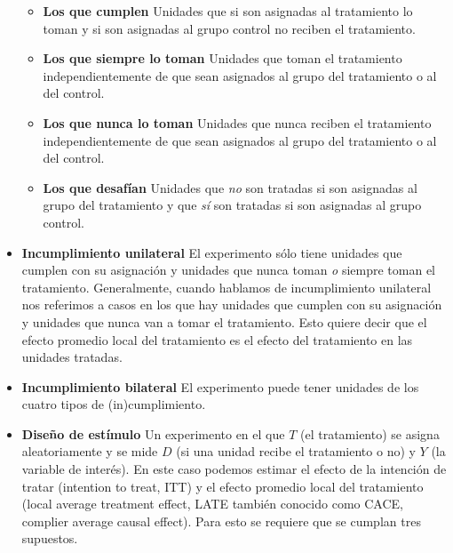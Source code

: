 \documentclass[
  12pt,
  spanish,
]{book}
\providecommand{\tightlist}{%
  \setlength{\itemsep}{0pt}\setlength{\parskip}{0pt}}
\begin{document}
\begin{itemize}
  \begin{itemize}
  \tightlist
  \item
    \textbf{Los que cumplen} Unidades que si son asignadas al tratamiento lo toman y si son asignadas al grupo control no reciben el tratamiento.
  \item
    \textbf{Los que siempre lo toman} Unidades que toman el tratamiento independientemente de que sean asignados al grupo del tratamiento o al del control.
  \item
    \textbf{Los que nunca lo toman} Unidades que nunca reciben el tratamiento independientemente de que sean asignados al grupo del tratamiento o al del control.
  \item
    \textbf{Los que desafían} Unidades que \emph{no} son tratadas si son asignadas al grupo del tratamiento y que \emph{sí} son tratadas si son asignadas al grupo control.
  \end{itemize}
\item
  \textbf{Incumplimiento unilateral} El experimento sólo tiene unidades que cumplen con su asignación y unidades que nunca toman \emph{o} siempre toman el tratamiento. Generalmente, cuando hablamos de incumplimiento unilateral nos referimos a casos en los que hay unidades que cumplen con su asignación y unidades que nunca van a tomar el tratamiento. Esto quiere decir que el efecto promedio local del tratamiento es el efecto del tratamiento en las unidades tratadas.
\item
  \textbf{Incumplimiento bilateral} El experimento puede tener unidades de los cuatro tipos de (in)cumplimiento.
\item
  \textbf{Diseño de estímulo} Un experimento en el que \(T\) (el tratamiento) se asigna aleatoriamente y se mide \(D\) (si una unidad recibe el tratamiento o no) y \(Y\) (la variable de interés). En este caso podemos estimar el efecto de la intención de tratar (intention to treat, ITT) y el efecto promedio local del tratamiento (local average treatment effect, LATE también conocido como CACE, complier average causal effect). Para esto se requiere que se cumplan tres supuestos.


\end{itemize}
\end{document}
